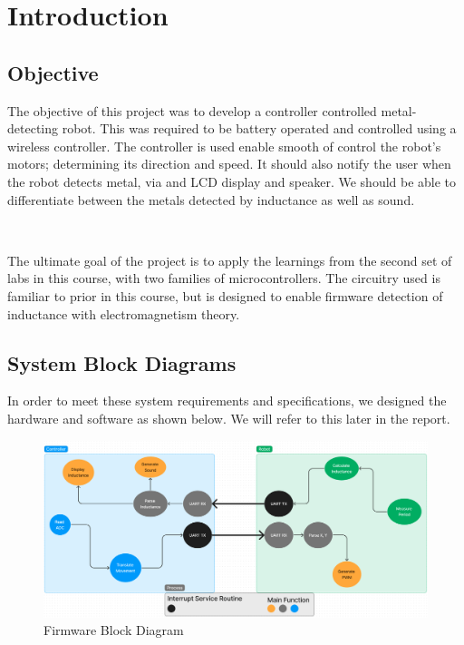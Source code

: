 \documentclass{article}
\begin{document}
\newpage

\tableofcontents

\newpage
\section{Introduction}

\subsection{Objective}

The objective of this project was to develop a controller controlled metal-detecting robot. This was required to be
battery operated and controlled using a wireless controller. The controller is used enable smooth of control the robot's
motors; determining its direction and speed. It should also notify the user when the robot detects metal, via and LCD
display and speaker. We should be able to differentiate between the metals detected by inductance as well as sound.

\

The ultimate goal of the project is to apply the learnings from the second set of labs in this course, with two families of microcontrollers.
The circuitry used is familiar to prior in this course, but is designed to enable firmware detection of inductance with electromagnetism theory.

\subsection{System Block Diagrams}

In order to meet these system requirements and specifications, we designed the hardware and software as shown below. We will refer to this later in the report.

\begin{figure}[h]
        \centering
        \includegraphics[width=1\linewidth]{Figures/Firmware_Block_Diagram.png}
        \caption{Firmware Block Diagram}
        \label{fig:firmware_block_diagram}
\end{figure}
\end{document}
